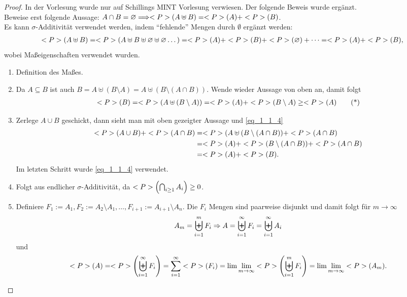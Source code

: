 \begin{proof}
	In der Vorlesung wurde nur auf Schillings MINT Vorlesung verwiesen. Der folgende Beweis wurde ergänzt.\\
	Beweise erst folgende Aussage: $A\cap B = \varnothing \Longrightarrow <P>(A \uplus B) = <P>(A) + <P>(B)$.\\
	Es kann $\sigma$-Additivität verwendet werden, indem ``fehlende'' Mengen durch $\emptyset$ ergänzt werden:
	\begin{align}
		<P>(A \uplus B) = <P>(A \uplus B \uplus \varnothing \uplus \varnothing \dots) = <P>(A) + <P>(B) + <P>(\varnothing) + \dots = <P>(A) + <P>(B),\notag
	\end{align}
	wobei Maßeigenschaften verwendet wurden.
	\begin{enumerate}
		\item Definition des Maßes.
		\item Da $A \subseteq B$ ist auch $B = A \uplus (B \setminus A) = A \uplus (B \setminus (A \cap B))$. Wende wieder Aussage von oben an, damit folgt
		\begin{align}
			<P>(B) = <P>(A \uplus (B \setminus A)) = <P>(A) + <P>(B \setminus A) \ge <P>(A) \label{eq_1_1_4}\tag{*}
		\end{align}
		\item Zerlege $A \cup B$ geschickt, dann sieht man mit oben gezeigter Aussage und \cref{eq_1_1_4}
		\begin{align}
			<P>(A \cup B) + <P>(A \cap B) &= <P>(A \uplus (B \setminus (A \cap B)) + <P>(A \cap B)\notag \\
			&= <P>(A) + <P>(B \setminus (A \cap B)) + <P>(A \cap B)\notag\\
			&= <P>(A)+<P>(B).\notag	
		\end{align}
		Im letzten Schritt wurde \cref{eq_1_1_4} verwendet.
		\item Folgt aus endlicher $\sigma$-Additivität, da $<P>\left(\bigcap_{i\ge 1} A_i \right) \ge 0$.
		\item Definiere $F_1 := A_1, F_2 := A_2 \setminus A_1, \dots, F_{i+1} := A_{i+1}\setminus A_n$. Die $F_i$ Mengen sind paarweise disjunkt und damit folgt für $m \to \infty$
		\begin{align}
			A_m = \biguplus_{i=1}^{m} F_i \Rightarrow A = \biguplus_{i=1}^{\infty} F_i = \biguplus_{i=1}^{\infty} A_i\notag
		\end{align}
		und
		\begin{align}
			<P>(A) = <P>\left( \biguplus_{i=1}^{\infty} F_i \right) = \sum_{i=1}^{\infty} <P>(F_i) = \lim\lim_{m \to \infty} <P>\left( \biguplus_{i=1}^{m} F_i \right) = \lim\lim_{m\to \infty} <P>(A_m). \notag
		\end{align}
	\end{enumerate}
\end{proof}

